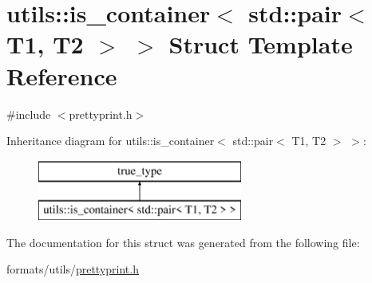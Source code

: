 \hypertarget{structutils_1_1is__container_3_01std_1_1pair_3_01_t1_00_01_t2_01_4_01_4}{}\section{utils\+::is\+\_\+container$<$ std\+::pair$<$ T1, T2 $>$ $>$ Struct Template Reference}
\label{structutils_1_1is__container_3_01std_1_1pair_3_01_t1_00_01_t2_01_4_01_4}


{\ttfamily \#include $<$prettyprint.\+h$>$}

Inheritance diagram for utils\+::is\+\_\+container$<$ std\+::pair$<$ T1, T2 $>$ $>$\+:\begin{figure}[H]
\begin{center}
\leavevmode
\includegraphics[height=2.000000cm]{d0/d06/structutils_1_1is__container_3_01std_1_1pair_3_01_t1_00_01_t2_01_4_01_4}
\end{center}
\end{figure}


The documentation for this struct was generated from the following file\+:\begin{DoxyCompactItemize}
\item 
formats/utils/\mbox{\hyperlink{prettyprint_8h}{prettyprint.\+h}}\end{DoxyCompactItemize}
